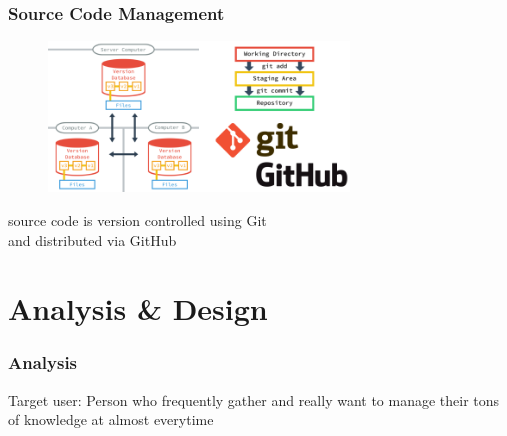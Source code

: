 \documentclass[10pt, compress]{beamer}
\begin{document}

\begin{frame}[fragile]
  \frametitle{Source Code Management}
  \centering

  \begin{figure}[ht]
    \includegraphics[width=8cm]{include/literature-scm.png}
  \end{figure}

  source code is version controlled using \alert{Git}\\
  and distributed via GitHub

\end{frame}


\section{Analysis \& Design}


\begin{frame}[fragile]
  \frametitle{Analysis}

    \begin{block}{Target user:}
      Person who frequently gather and really want to manage their tons of knowledge at almost everytime
    \end{block}

\end{frame}

\end{document}
